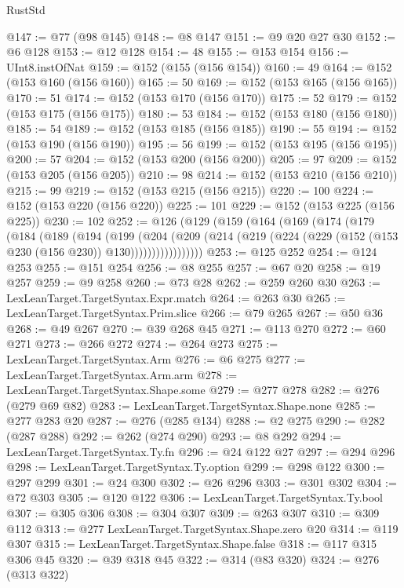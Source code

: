 \begin{lexlean}{RustStd}
\begin{coremodule}
@147 := @77 (@98 @145)
@148 := @8 @147
@151 := @9 @20 @27 @30
@152 := @6 @128
@153 := @12 @128
@154 := 48
@155 := @153 @154
@156 := UInt8.instOfNat
@159 := @152 (@155 (@156 @154))
@160 := 49
@164 := @152 (@153 @160 (@156 @160))
@165 := 50
@169 := @152 (@153 @165 (@156 @165))
@170 := 51
@174 := @152 (@153 @170 (@156 @170))
@175 := 52
@179 := @152 (@153 @175 (@156 @175))
@180 := 53
@184 := @152 (@153 @180 (@156 @180))
@185 := 54
@189 := @152 (@153 @185 (@156 @185))
@190 := 55
@194 := @152 (@153 @190 (@156 @190))
@195 := 56
@199 := @152 (@153 @195 (@156 @195))
@200 := 57
@204 := @152 (@153 @200 (@156 @200))
@205 := 97
@209 := @152 (@153 @205 (@156 @205))
@210 := 98
@214 := @152 (@153 @210 (@156 @210))
@215 := 99
@219 := @152 (@153 @215 (@156 @215))
@220 := 100
@224 := @152 (@153 @220 (@156 @220))
@225 := 101
@229 := @152 (@153 @225 (@156 @225))
@230 := 102
@252 := @126
    (@129
      (@159
        (@164
          (@169
            (@174
              (@179
                (@184
                  (@189
                    (@194
                      (@199
                        (@204
                          (@209
                            (@214
                              (@219 (@224 (@229 (@152 (@153 @230 (@156 @230)) @130)))))))))))))))))
@253 := @125 @252
@254 := @124 @253
@255 := @151 @254
@256 := @8 @255
@257 := @67 @20
@258 := @19 @257
@259 := @9 @258
@260 := @73 @28
@262 := @259 @260 @30
@263 := LexLeanTarget.TargetSyntax.Expr.match
@264 := @263 @30
@265 := LexLeanTarget.TargetSyntax.Prim.slice
@266 := @79 @265
@267 := @50 @36
@268 := @49 @267
@270 := @39 @268 @45
@271 := @113 @270
@272 := @60 @271
@273 := @266 @272
@274 := @264 @273
@275 := LexLeanTarget.TargetSyntax.Arm
@276 := @6 @275
@277 := LexLeanTarget.TargetSyntax.Arm.arm
@278 := LexLeanTarget.TargetSyntax.Shape.some
@279 := @277 @278
@282 := @276 (@279 @69 @82)
@283 := LexLeanTarget.TargetSyntax.Shape.none
@285 := @277 @283 @20
@287 := @276 (@285 @134)
@288 := @2 @275
@290 := @282 (@287 @288)
@292 := @262 (@274 @290)
@293 := @8 @292
@294 := LexLeanTarget.TargetSyntax.Ty.fn
@296 := @24 @122 @27
@297 := @294 @296
@298 := LexLeanTarget.TargetSyntax.Ty.option
@299 := @298 @122
@300 := @297 @299
@301 := @24 @300
@302 := @26 @296
@303 := @301 @302
@304 := @72 @303
@305 := @120 @122
@306 := LexLeanTarget.TargetSyntax.Ty.bool
@307 := @305 @306
@308 := @304 @307
@309 := @263 @307
@310 := @309 @112
@313 := @277 LexLeanTarget.TargetSyntax.Shape.zero @20
@314 := @119 @307
@315 := LexLeanTarget.TargetSyntax.Shape.false
@318 := @117 @315 @306 @45
@320 := @39 @318 @45
@322 := @314 (@83 @320)
@324 := @276 (@313 @322)

\end{coremodule}
\end{lexlean}
